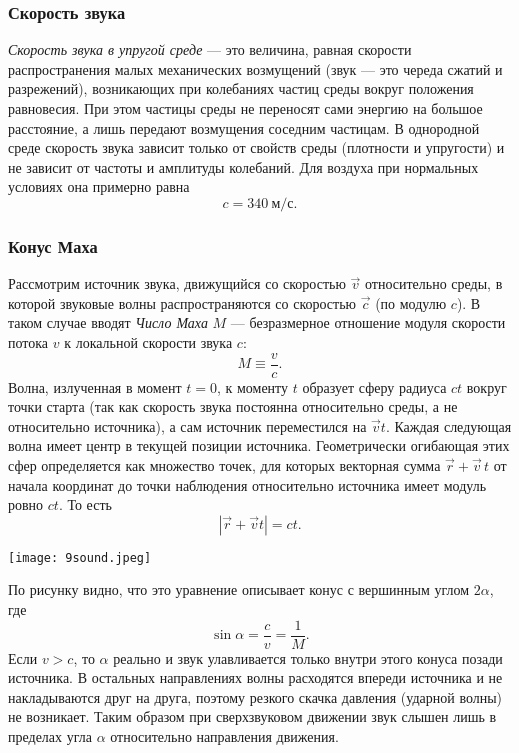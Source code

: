 \documentclass[12pt, a4paper]{article}%
\begin{document}
\subsubsection*{Скорость звука}
\textit{Скорость звука в упругой среде} — это величина, равная скорости распространения малых механических возмущений (звук — это череда сжатий и разрежений), возникающих при колебаниях частиц среды вокруг положения равновесия. При этом частицы среды не переносят сами энергию на большое расстояние, а лишь передают возмущения соседним частицам. В однородной среде скорость звука зависит только от свойств среды (плотности и упругости) и не зависит от частоты и амплитуды колебаний. Для воздуха при нормальных условиях она примерно равна \[ c = 340\ \mathrm{м/с}.\]

\subsubsection*{Конус Маха}
Рассмотрим источник звука, движущийся со скоростью $\vec{v}$ относительно среды, в которой звуковые волны распространяются
со скоростью $\vec{c}$ (по модулю $c$). В таком случае вводят \emph{Число Маха} $M$ — безразмерное отношение модуля скорости потока $v$ к
локальной скорости звука $c$:
\[
M \equiv \frac{v}{c}.
\]
Волна, излученная в момент $t=0$, к моменту $t$ образует сферу радиуса $ct$ вокруг точки
старта (так как скорость звука постоянна относительно среды, а не относительно источника), а сам источник переместился на $\vec{v}t$. Каждая следующая волна имеет центр в текущей позиции источника. Геометрически огибающая этих сфер определяется как множество точек, для которых векторная сумма  
$\vec{r} + \vec{v}\,t$  
от начала координат до точки наблюдения относительно источника имеет модуль ровно $ct$. То есть  
\[
|\vec{r} + \vec{v}t| = ct.
\]

\begin{center}
\texttt{[image: 9sound.jpeg]}
\label{fig:mpr}
\end{center}

По рисунку видно, что это уравнение описывает конус с вершинным углом $2\alpha$, где  
\[
\sin\alpha = \frac{c}{v} = \frac1M.
\]
Если $v>c$, то $\alpha$ реально и звук улавливается только внутри этого конуса позади источника. В остальных направлениях волны расходятся впереди источника и не накладываются друг на друга, поэтому резкого скачка давления (ударной волны) не возникает. Таким образом при сверхзвуковом движении звук слышен лишь в пределах угла $\alpha$ относительно направления движения.  
\end{document}
